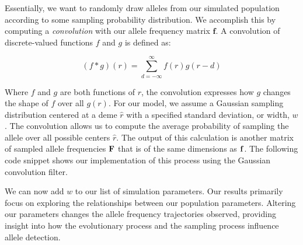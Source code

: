 Essentially, we want to randomly draw alleles from our simulated population according to some sampling probability distribution. We accomplish this by computing a \textit{convolution} with our allele frequency matrix $\textbf{f}$. A convolution of discrete-valued functions $f$ and $g$ is defined as:

\begin{equation}\label{eq:convolution}
    (f*g)(r) = \sum_{d=-\infty}^\infty f(r)g(r-d)
\end{equation}


Where $f$ and $g$ are both functions of $r$, the convolution expresses how $g$ changes the shape of $f$ over all $g(r)$. For our model, we assume a Gaussian sampling distribution centered at a deme $\hat{r}$ with a specified standard deviation, or width, $w$. The convolution allows us to compute the average probability of sampling the allele over all possible centers $\hat{r}$. The output of this calculation is another matrix of sampled allele frequencies $\bf{F}$ that is of the same dimensions as $\bf{f}$. The following code snippet shows our implementation of this process using the  Gaussian convolution filter. 





We can now add $w$ to our list of simulation parameters. Our results primarily focus on exploring the relationships between our population parameters. Altering our parameters changes the allele frequency trajectories observed, providing insight into how the evolutionary process and the sampling process influence allele detection.        


